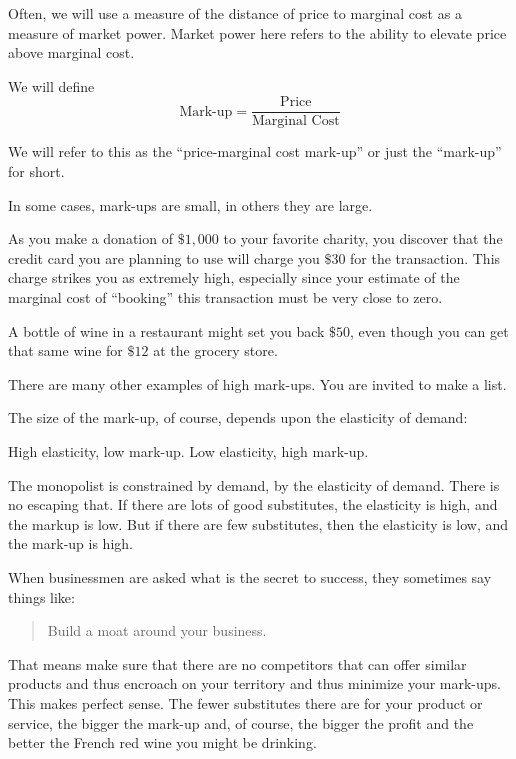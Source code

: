 \documentclass[
]{book}
\begin{document}
Often, we will use a measure of the distance of price to marginal cost as a measure of market power. Market power here refers to the ability to elevate price above marginal cost.

We will define
\[\text{Mark-up}  =  \frac{\text{Price}}{\text{Marginal Cost}}\]

We will refer to this as the ``price-marginal cost mark-up'' or just the ``mark-up'' for short.

In some cases, mark-ups are small, in others they are large.

As you make a donation of \(\$1,000\) to your favorite charity, you discover that the credit card you are planning to use will charge you \(\$30\) for the transaction. This charge strikes you as extremely high, especially since your estimate of the marginal cost of ``booking'' this transaction must be very close to zero.

A bottle of wine in a restaurant might set you back \(\$50\), even though you can get that same wine for \(\$12\) at the grocery store.

There are many other examples of high mark-ups. You are invited to make a list.

The size of the mark-up, of course, depends upon the elasticity of demand:

\begin{center}
High elasticity, low mark-up.
Low elasticity, high mark-up.

\end{center}

The monopolist is constrained by demand, by the elasticity of demand. There is no escaping that. If there are lots of good substitutes, the elasticity is high, and the markup is low. But if there are few substitutes, then the elasticity is low, and the mark-up is high.

When businessmen are asked what is the secret to success, they sometimes say things like:

\begin{quote}
Build a moat around your business.
\end{quote}

That means make sure that there are no competitors that can offer similar products and thus encroach on your territory and thus minimize your mark-ups. This makes perfect sense. The fewer substitutes there are for your product or service, the bigger the mark-up and, of course, the bigger the profit and the better the French red wine you might be drinking.
\end{document}
